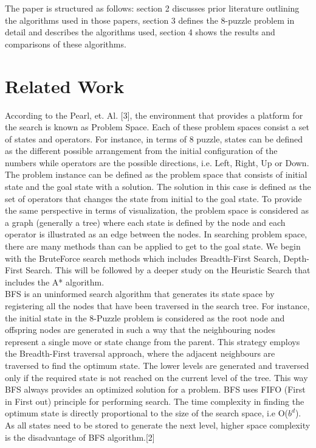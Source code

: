 \documentclass{svproc}
\begin{document}
\noindent The paper is structured as follows: section 2 discusses prior literature outlining the algorithms used in those papers,  section 3 defines the 8-puzzle problem in detail and describes the algorithms used, section 4 shows the results and comparisons of these algorithms.

\section{Related Work}
\noindent According to the Pearl, et. Al. [3], the environment that provides a platform for the search is known as Problem Space. Each of these problem spaces consist a set of states and operators. For instance, in terms of 8 puzzle, states can be defined as the different possible arrangement from the initial configuration of the numbers while operators are the possible directions, i.e. Left, Right, Up or Down. The problem instance can be defined as the problem space that consists of initial state and the goal state with a solution. The solution in this case is defined as the set of operators that changes the state from initial to the goal state. To provide the same perspective in terms of visualization, the problem space is considered as a graph (generally a tree) where each state is defined by the node and each operator is illustrated as an edge between the nodes. In searching problem space, there are many methods than can be applied to get to the goal state. We begin with the BruteForce search methods which includes Breadth-First Search, Depth-First Search. This will be followed by a deeper study on the Heuristic Search that includes the A* algorithm.\\

\noindent BFS is an uninformed search algorithm that generates its state space by registering all the nodes that have been traversed in the search tree. For instance, the initial state in the 8-Puzzle problem is considered as the root node and offspring nodes are generated in such a way that the neighbouring nodes represent a single move or state change from the parent. This strategy employs the Breadth-First traversal approach, where the adjacent neighbours are traversed to find the optimum state. The lower levels are generated and traversed only if the required state is not reached on the current level of the tree. This way BFS always provides an optimized solution for a problem. BFS uses FIFO (First in First out) principle for performing search. The time complexity in finding the optimum state is directly proportional to the size of the search space, i.e O($b^{d}$). As all states need to be stored to generate the next level, higher space complexity is the disadvantage of BFS algorithm.[2]\\
\end{document}
